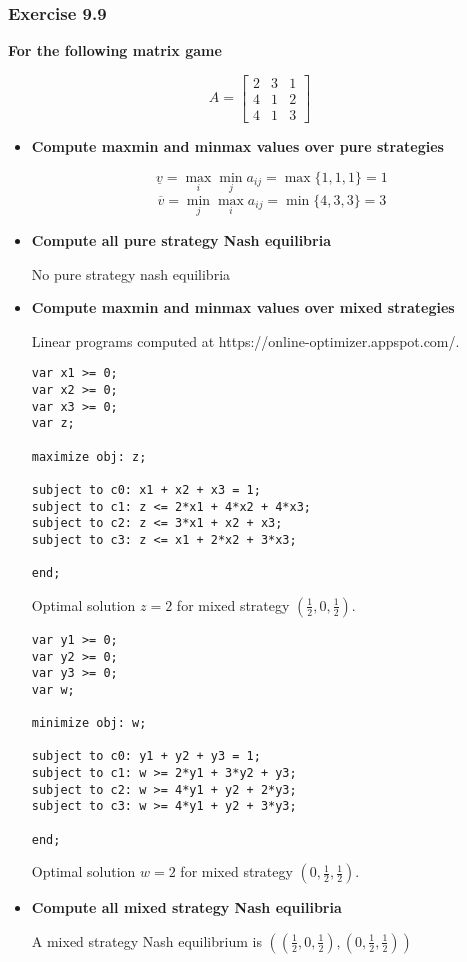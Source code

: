 \documentclass[12pt, a4paper]{article}
\begin{document}
\subsubsection*{Exercise 9.9}

\textbf{For the following matrix game}

    \[A = \begin{bmatrix}
        2 & 3 & 1 \\
        4 & 1 & 2 \\
        4 & 1 & 3
    \end{bmatrix}\]

\begin{itemize}
    \item \textbf{Compute maxmin and minmax values over pure strategies}
    
    \[ \underline{v} = \max_i \min_j a_{ij} = \max\{1, 1, 1\} = 1 \]
    \[ \overline{v} = \min_j \max_i a_{ij} = \min\{4, 3, 3\} = 3 \]


    \item \textbf{Compute all pure strategy Nash equilibria}
    
    No pure strategy nash equilibria

    \item \textbf{Compute maxmin and minmax values over mixed strategies}
    
    Linear programs computed at https://online-optimizer.appspot.com/.

    \begin{verbatim}
var x1 >= 0;
var x2 >= 0;
var x3 >= 0;
var z;

maximize obj: z;

subject to c0: x1 + x2 + x3 = 1;
subject to c1: z <= 2*x1 + 4*x2 + 4*x3;
subject to c2: z <= 3*x1 + x2 + x3;
subject to c3: z <= x1 + 2*x2 + 3*x3;

end;
    \end{verbatim}

    Optimal solution $z=2$ for mixed strategy $\left(\frac{1}{2}, 0, \frac{1}{2}\right)$.

    \begin{verbatim}
var y1 >= 0;
var y2 >= 0;
var y3 >= 0;
var w;

minimize obj: w;

subject to c0: y1 + y2 + y3 = 1;
subject to c1: w >= 2*y1 + 3*y2 + y3;
subject to c2: w >= 4*y1 + y2 + 2*y3;
subject to c3: w >= 4*y1 + y2 + 3*y3;

end;
    \end{verbatim}

    Optimal solution $w=2$ for mixed strategy $\left(0, \frac{1}{2}, \frac{1}{2}\right)$.

    \item \textbf{Compute all mixed strategy Nash equilibria}
    
    A mixed strategy Nash equilibrium is $\left(\left(\frac{1}{2}, 0, \frac{1}{2}\right), \left(0, \frac{1}{2}, \frac{1}{2} \right) \right)$

\end{itemize}




\end{document}
